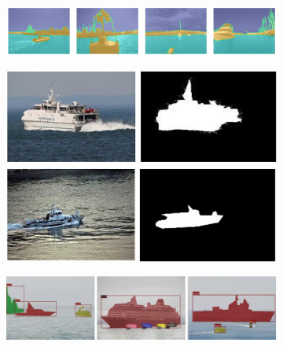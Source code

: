 \begin{figure}[ht]
    \centering
    \begin{subfigure}[b]{0.9\textwidth}
        \centering
        \includegraphics[width=\textwidth]{figures/MaSTr1325/official-annotation.jpg}
        \caption{}
        \label{fig:mastr1325}
    \end{subfigure}
    \hfill
    \centering
    \begin{minipage}{0.49\textwidth}
    \begin{subfigure}[b]{0.75\textwidth}
        \centering
        \includegraphics[width=\textwidth]{figures/D_MariShipSeg-HEU.jpg}
        \caption{}
        \label{fig:marishipseg}
    \end{subfigure}
    \hfill
    \end{minipage}
     \hspace{-0.1\textwidth}
    \begin{minipage}{0.49\textwidth}
    \centering
    \begin{subfigure}[b]{1\textwidth}
        \centering
        \includegraphics[width=\textwidth]{figures/D_Foggy.jpg}

\end{subfigure}
\end{minipage}
\end{figure}
